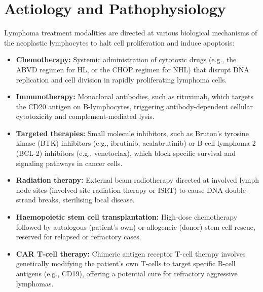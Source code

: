 \section*{Aetiology and Pathophysiology}
Lymphoma treatment modalities are directed at various biological mechanisms of the neoplastic lymphocytes to halt cell proliferation and induce apoptosis:
\begin{itemize}
    \item \textbf{Chemotherapy:} Systemic administration of cytotoxic drugs (e.g., the ABVD regimen for HL, or the CHOP regimen for NHL) that disrupt DNA replication and cell division in rapidly proliferating lymphoma cells.
    \item \textbf{Immunotherapy:} Monoclonal antibodies, such as rituximab, which targets the CD20 antigen on B-lymphocytes, triggering antibody-dependent cellular cytotoxicity and complement-mediated lysis.
    \item \textbf{Targeted therapies:} Small molecule inhibitors, such as Bruton's tyrosine kinase (BTK) inhibitors (e.g., ibrutinib, acalabrutinib) or B-cell lymphoma 2 (BCL-2) inhibitors (e.g., venetoclax), which block specific survival and signaling pathways in cancer cells.
    \item \textbf{Radiation therapy:} External beam radiotherapy directed at involved lymph node sites (involved site radiation therapy or ISRT) to cause DNA double-strand breaks, sterilising local disease.
    \item \textbf{Haemopoietic stem cell transplantation:} High-dose chemotherapy followed by autologous (patient's own) or allogeneic (donor) stem cell rescue, reserved for relapsed or refractory cases.
    \item \textbf{CAR T-cell therapy:} Chimeric antigen receptor T-cell therapy involves genetically modifying the patient's own T-cells to target specific B-cell antigens (e.g., CD19), offering a potential cure for refractory aggressive lymphomas.
\end{itemize}

